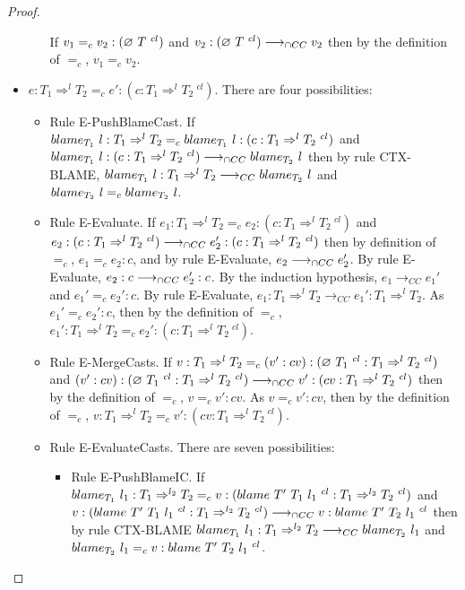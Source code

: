 \documentclass[a4paper]{article}
\begin{document}
\begin{proof}
\begin{itemize}
\begin{itemize}
        If $v_1 =_c v_2 : (\varnothing\ T\ ^{cl})$ and $v_2 : (\varnothing\ T\ ^{cl}) \longrightarrow_{\cap CC} v_2$ then by the definition of $=_c$, $v_1 =_c v_2$.
    \end{itemize}
    \item $e : T_1 \Rightarrow^l T_2 =_c e' : (c : T_1 \Rightarrow^l T_2\ ^{cl})$.
    There are four possibilities:
    \begin{itemize}
        \item Rule E-PushBlameCast.
        If $blame_{T_1}\ l : T_1 \Rightarrow^l T_2 =_c blame_{T_1}\ l : (c : T_1 \Rightarrow^l T_2\ ^{cl})$ and $blame_{T_1}\ l : (c : T_1 \Rightarrow^l T_2\ ^{cl}) \longrightarrow_{\cap CC} blame_{T_2}\ l$ then by rule CTX-BLAME, $blame_{T_1}\ l : T_1 \Rightarrow^l T_2 \longrightarrow_{CC} blame_{T_2}\ l$ and $blame_{T_2}\ l =_c blame_{T_2}\ l$.
        \item Rule E-Evaluate.
        If $e_1 : T_1 \Rightarrow^l T_2 =_c e_2 : (c : T_1 \Rightarrow^l T_2\ ^{cl})$ and $e_2 : (c : T_1 \Rightarrow^l T_2\ ^{cl}) \longrightarrow_{\cap CC} e_2' : (c : T_1 \Rightarrow^l T_2\ ^{cl})$ then by definition of $=_c$, $e_1 =_c e_2 : c$, and by rule E-Evaluate, $e_2 \longrightarrow_{\cap CC} e_2'$.
        By rule E-Evaluate, $e_2 : c \longrightarrow_{\cap CC} e_2' : c$.
        By the induction hypothesis, $e_1 \longrightarrow_{CC} e_1'$ and $e_1' =_c e_2' : c$.
        By rule E-Evaluate, $e_1 : T_1 \Rightarrow^l T_2 \longrightarrow_{CC} e_1' : T_1 \Rightarrow^l T_2$.
        As $e_1' =_c e_2' : c$, then by the definition of $=_c$, $e_1' : T_1 \Rightarrow^l T_2 =_c e_2' : (c : T_1 \Rightarrow^l T_2\ ^{cl})$.
        \item Rule E-MergeCasts.
        If $v : T_1 \Rightarrow^l T_2 =_c (v' : cv ) : (\varnothing\ T_1\ ^{cl} : T_1 \Rightarrow^l T_2\ ^{cl})$ and $(v' : cv ) : (\varnothing\ T_1\ ^{cl} : T_1 \Rightarrow^l T_2\ ^{cl}) \longrightarrow_{\cap CC} v' : (cv : T_1 \Rightarrow^l T_2\ ^{cl})$ then by the definition of $=_c$, $v =_c v' : cv$.
        As $v =_c v' : cv$, then by the definition of $=_c$, $v : T_1 \Rightarrow^l T_2 =_c v' : (cv : T_1 \Rightarrow^l T_2\ ^{cl})$.
        \item Rule E-EvaluateCasts.
        There are seven possibilities:
        \begin{itemize}
            \item Rule E-PushBlameIC.
            If $\blame{T_1}{l_1} : T_1 \Rightarrow^{l_2} T_2 =_c v : (\blamecast{T'}{T_1}{l_1}{cl} : T_1 \Rightarrow^{l_2} T_2\ ^{cl})$ and $v : (blame\ T'\ T_1\ l_1\ ^{cl} : T_1 \Rightarrow^{l_2} T_2\ ^{cl}) \longrightarrow_{\cap CC} v : blame\ T'\ T_2\ l_1\ ^{cl}$ then by rule CTX-BLAME $blame_{T_1}\ l_1 : T_1 \Rightarrow^{l_2} T_2 \longrightarrow_{CC} blame_{T_2}\ l_1$ and $blame_{T_2}\ l_1 =_c v : blame\ T'\ T_2\ l_1\ ^{cl}$.

\end{itemize}
\end{itemize}
\end{itemize}
\end{proof}
\end{document}
